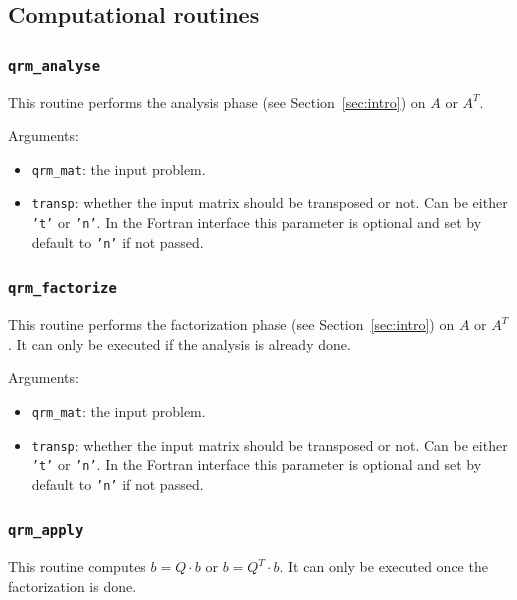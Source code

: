 \documentclass[11pt]{article}
\begin{document}
\subsection{Computational routines}
\subsubsection{\texttt{qrm\_analyse}}
This routine performs the analysis phase (see Section~\ref{sec:intro})
on $A$ or $A^T$.


\noindent Arguments:
\begin{itemize}
\item \texttt{qrm\_mat}: the input problem.
\item \texttt{transp}: whether the input matrix should be transposed
  or not. Can be either \texttt{'t'} or \texttt{'n'}. In the Fortran
  interface this parameter is optional and set by default to
  \texttt{'n'} if not passed.
\end{itemize}


\subsubsection{\texttt{qrm\_factorize}}
This routine performs the factorization phase (see Section~\ref{sec:intro})
on $A$ or $A^T$. It can only be executed if the analysis is already done.


\noindent Arguments:
\begin{itemize}
\item \texttt{qrm\_mat}: the input problem.
\item \texttt{transp}: whether the input matrix should be transposed
  or not. Can be either \texttt{'t'} or \texttt{'n'}. In the Fortran
  interface this parameter is optional and set by default to
  \texttt{'n'} if not passed.
\end{itemize}

\subsubsection{\texttt{qrm\_apply}}
This routine computes $b=Q\cdot b$ or $b=Q^T\cdot b$. It can only be
executed once the factorization is done.

\end{document}
